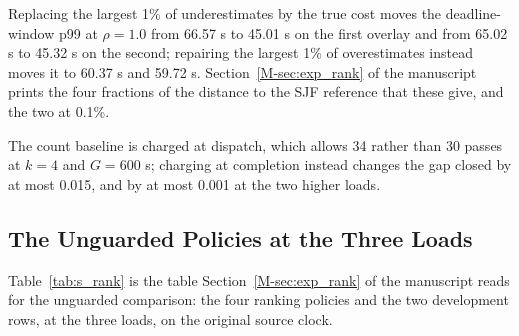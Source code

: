 \documentclass[mathematics,supfile,submit,moreauthors]{Definitions/mdpi}
\newcommand{\devnum}[1]{#1}
\begin{document}
Replacing the largest \devnum{1\%} of underestimates by the true cost moves the
deadline-window p99 at $\rho = \devnum{1.0}$ from \devnum{66.57} s to \devnum{45.01} s on
the first overlay and from \devnum{65.02} s to \devnum{45.32} s on the second; repairing
the largest \devnum{1\%} of overestimates instead moves it to \devnum{60.37} s and
\devnum{59.72} s. Section~\ref*{M-sec:exp_rank} of the manuscript prints the four fractions of the distance
to the SJF reference that these give, and the two at \devnum{0.1\%}.

The count baseline is charged at dispatch, which allows \devnum{34} rather than
\devnum{30} passes at $k = \devnum{4}$ and $G = \devnum{600}$ s; charging at completion
instead changes the gap closed by at most \devnum{0.015}, and by at most \devnum{0.001}
at the two higher loads.

\subsection{The Unguarded Policies at the Three Loads}
\label{sec:supp_rank}

Table~\ref{tab:s_rank} is the table Section~\ref*{M-sec:exp_rank} of the manuscript reads for the
unguarded comparison: the four ranking policies and the two development rows, at the
three loads, on the original source clock.
\end{document}
